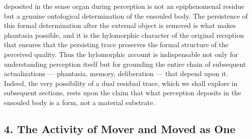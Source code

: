 deposited in the sense organ during perception is not an epiphenomenal residue but a genuine ontological determination of the ensouled body. The persistence of this formal determination after the external object is removed is what makes phantasia possible, and it is the hylomorphic character of the original reception that ensures that the persisting trace preserves the formal structure of the perceived quality. Thus the hylomorphic account is indispensable not only for understanding perception itself but for grounding the entire chain of subsequent actualizations --- phantasia, memory, deliberation --- that depend upon it. Indeed, the very possibility of a dual residual trace, which we shall explore in subsequent sections, rests upon the claim that what perception deposits in the ensouled body is a form, not a material substrate. 

\subsection*{4. The Activity of Mover and Moved as One}

